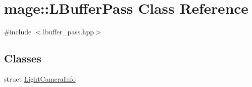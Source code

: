 \hypertarget{classmage_1_1_l_buffer_pass}{}\section{mage\+:\+:L\+Buffer\+Pass Class Reference}
\label{classmage_1_1_l_buffer_pass}


{\ttfamily \#include $<$lbuffer\+\_\+pass.\+hpp$>$}

\subsection*{Classes}
\begin{DoxyCompactItemize}
\item 
struct \hyperlink{structmage_1_1_l_buffer_pass_1_1_light_camera_info}{Light\+Camera\+Info}
\end{DoxyCompactItemize}
